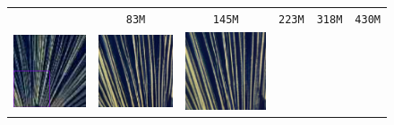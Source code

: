 \begin{figure}[!ht]
\begin{tabular}[t]{c c c c c c}
    \\[-0.2em]
    & \scriptsize \texttt{83M} & \scriptsize \texttt{145M} & \scriptsize \texttt{223M} & \scriptsize \texttt{318M} & \scriptsize \texttt{430M}
    \\
    \multirow[t]{3}{*}{
    \includegraphics[width=0.26\linewidth,height=0.26\linewidth]{cp2/figures/sr/scaling_sr_lr_1.png}
    } &
    \includegraphics[width=\xwidth]{cp2/figures/sr/scaling_sr_c256_1.png} &
    \includegraphics[width=\xwidth]{cp2/figures/sr/scaling_sr_c320_1.png} &

\end{tabular}
\end{figure}
